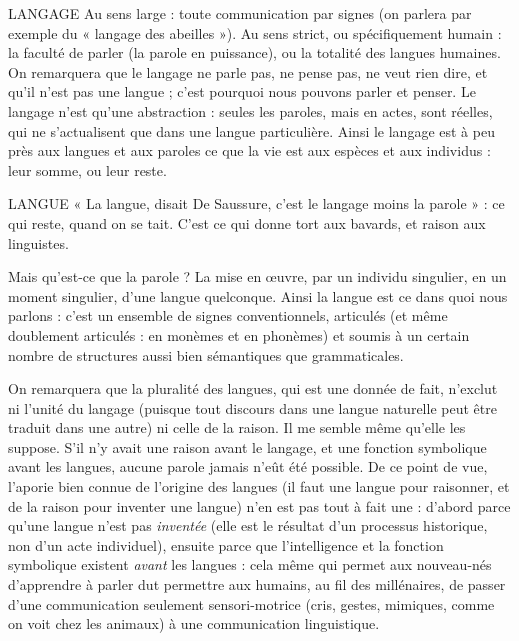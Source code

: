 {LANGAGE Au sens large : toute communication par signes (on parlera par
exemple du « langage des abeilles »). Au sens strict, ou spécifiquement
humain : la faculté de parler (la parole en puissance), ou la totalité des
langues humaines. On remarquera que le langage ne parle pas, ne pense pas, ne
veut rien dire, et qu’il n’est pas une langue ; c’est pourquoi nous pouvons parler
et penser. Le langage n’est qu’une abstraction : seules les paroles, mais en actes,
sont réelles, qui ne s’actualisent que dans une langue particulière. Ainsi le langage
est à peu près aux langues et aux paroles ce que la vie est aux espèces et aux
individus : leur somme, ou leur reste.

LANGUE  « La langue, disait De Saussure, c’est le langage moins la parole » :
ce qui reste, quand on se tait. C’est ce qui donne tort aux bavards,
et raison aux linguistes.

Mais qu'est-ce que la parole ? La mise en œuvre, par un individu singulier,
en un moment singulier, d’une langue quelconque. Ainsi la langue est ce dans
quoi nous parlons : c’est un ensemble de signes conventionnels, articulés (et
même doublement articulés : en monèmes et en phonèmes) et soumis à un certain
nombre de structures aussi bien sémantiques que grammaticales.

On remarquera que la pluralité des langues, qui est une donnée de fait,
n'exclut ni l’unité du langage (puisque tout discours dans une langue naturelle
peut être traduit dans une autre) ni celle de la raison. Il me semble même
qu’elle les suppose. S'il n’y avait une raison avant le langage, et une fonction
symbolique avant les langues, aucune parole jamais n’eût été possible. De ce
point de vue, l’aporie bien connue de l’origine des langues (il faut une langue
pour raisonner, et de la raison pour inventer une langue) n’en est pas tout à fait
une : d’abord parce qu’une langue n’est pas {\it inventée} (elle est le résultat d’un
processus historique, non d’un acte individuel), ensuite parce que l'intelligence
et la fonction symbolique existent {\it avant} les langues : cela même qui permet aux
nouveau-nés d'apprendre à parler dut permettre aux humains, au fil des millénaires,
de passer d’une communication seulement sensori-motrice (cris, gestes,
mimiques, comme on voit chez les animaux) à une communication linguistique.

}
